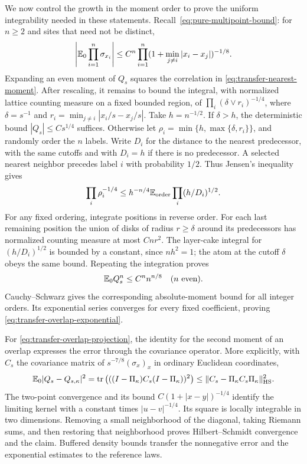 We now control the growth in the moment order to prove the uniform
integrability needed in these statements.  Recall~\eqref{eq:pure-multipoint-bound}:
for $n\geq2$ and sites that need not be distinct,
\begin{equation}
 \left|\mathbb E_0\prod_{i=1}^n\sigma_{x_i}\right|
 \leq C^n\prod_{i=1}^n
       (1+\min_{j\ne i}|x_i-x_j|)^{-1/8}.
 \label{eq:transfer-nearest-moment}
\end{equation}
Expanding an even moment of $Q_s$ squares the correlation in
\eqref{eq:transfer-nearest-moment}.  After rescaling, it remains to
bound the integral, with normalized lattice counting measure on a fixed
bounded region, of
$\prod_i(\delta\vee r_i)^{-1/4}$, where $\delta=s^{-1}$ and
$r_i=\min_{j\ne i}|x_i/s-x_j/s|$.  Take $h=n^{-1/2}$.
If $\delta>h$, the deterministic bound $|Q_s|\leq Cs^{1/4}$ suffices.
Otherwise let
$\rho_i=\min\{h,\max\{\delta,r_i\}\}$, and randomly order the
$n$ labels.  Write $D_i$ for the distance to the nearest predecessor,
with the same cutoffs and with $D_i=h$ if there is no predecessor.
A selected nearest neighbor precedes label $i$ with probability $1/2$.
Thus Jensen's inequality gives
\begin{equation}
 \prod_i\rho_i^{-1/4}
 \leq h^{-n/4}\mathbb E_{\mathrm{order}}
        \prod_i(h/D_i)^{1/2}.
 \label{eq:transfer-ordering}
\end{equation}
For any fixed ordering, integrate positions in reverse order.  For each
last remaining position the union of disks of radius $r\geq\delta$
around its predecessors has normalized counting measure at most
$Cnr^2$.  The layer-cake integral for $(h/D_i)^{1/2}$ is bounded by a
constant, since $nh^2=1$; the atom at the cutoff $\delta$ obeys the same
bound.  Repeating the integration proves
\begin{equation}
 \mathbb E_0 Q_s^n\leq C^n n^{n/8}\quad(n\text{ even}).
 \label{eq:transfer-overlap-moments}
\end{equation}
Cauchy--Schwarz gives the corresponding absolute-moment bound for all
integer orders.  Its exponential series converges for every fixed
coefficient, proving \eqref{eq:transfer-overlap-exponential}.

For \eqref{eq:transfer-overlap-projection}, the identity for the
second moment of an overlap expresses the error through the covariance
operator.  More explicitly, with $C_s$ the covariance matrix of
$s^{-7/8}(\sigma_x)_x$ in ordinary Euclidean coordinates,
\[
 \mathbb E_0|Q_s-Q_{s,\kappa}|^2
 =\operatorname{tr}\left(((I-\Pi_\kappa)C_s
                     (I-\Pi_\kappa))^2\right)
 \leq\|C_s-\Pi_\kappa C_s\Pi_\kappa\|_{\mathrm{HS}}^2.
\]
The two-point convergence and its bound
$C(1+|x-y|)^{-1/4}$ identify the limiting kernel with a constant times
$|u-v|^{-1/4}$.  Its square is locally integrable in two dimensions.
Removing a small neighborhood of the diagonal, taking Riemann sums,
and then restoring that neighborhood proves Hilbert--Schmidt convergence
and the claim.  Buffered density bounds transfer the nonnegative error
and the exponential estimates to the reference laws.

